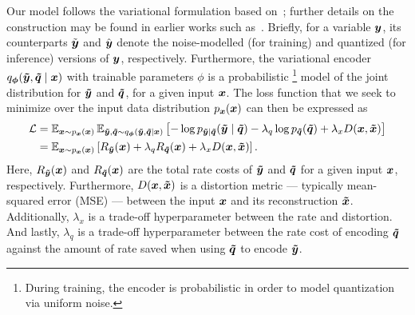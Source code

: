Our model follows the variational formulation based on~\cite{balle2018variational}; further details on the construction may be found in earlier works such as~\cite{kingma2013autoencoding,balle2017endtoend,theis2017lossy}.
Briefly, for a variable ${\boldsymbol{y}}$, its counterparts $\tilde{{\boldsymbol{y}}}$ and $\hat{{\boldsymbol{y}}}$ denote the noise-modelled (for training) and quantized (for inference) versions of ${\boldsymbol{y}}$, respectively.
Furthermore, the variational encoder $q_{{\boldsymbol{\phi}}}({\boldsymbol{\tilde{y}}}, {\boldsymbol{\tilde{q}}} \mid {\boldsymbol{x}})$ with trainable parameters $\phi$ is a probabilistic%
\footnote{During training, the encoder is probabilistic in order to model quantization via uniform noise.}
model of the joint distribution for ${\boldsymbol{\tilde{y}}}$ and ${\boldsymbol{\tilde{q}}}$, for a given input ${\boldsymbol{x}}$.
The loss function that we seek to minimize over the input data distribution $p_{{\boldsymbol{x}}}({\boldsymbol{x}})$ can then be expressed as
%
\begin{equation*}
  \begin{split}
    \mathcal{L}
    &=
    \operatorname{\mathbb{E}}_{{\boldsymbol{x}} \sim p_{{\boldsymbol{x}}}({\boldsymbol{x}})}
    \operatorname{\mathbb{E}}_{
      {\boldsymbol{\tilde{y}}}, {\boldsymbol{\tilde{q}}}
      \sim q_{{\boldsymbol{\phi}}}({\boldsymbol{\tilde{y}}}, {\boldsymbol{\tilde{q}}} \mid {\boldsymbol{x}})
    }
    \left[
      -\log p_{{\boldsymbol{\tilde{y}}} \mid {\boldsymbol{\tilde{q}}}}({\boldsymbol{\tilde{y}}} \mid {\boldsymbol{\tilde{q}}})
      - \lambda_q \log p_{{\boldsymbol{\tilde{q}}}}({\boldsymbol{\tilde{q}}})
      + \lambda_x D({\boldsymbol{x}}, {\boldsymbol{\tilde{x}}})
    \right]
    \\
    &=
    \operatorname{\mathbb{E}}_{{\boldsymbol{x}} \sim p_{{\boldsymbol{x}}}({\boldsymbol{x}})}
    \left[
      R_{{\boldsymbol{\tilde{y}}}}({\boldsymbol{x}})
      + \lambda_q R_{{\boldsymbol{\tilde{q}}}}({\boldsymbol{x}})
      + \lambda_x D({\boldsymbol{x}}, {\boldsymbol{\tilde{x}}})
    \right].
  \end{split}
\end{equation*}
%
Here, $R_{{\boldsymbol{\tilde{y}}}}({\boldsymbol{x}})$ and $R_{{\boldsymbol{\tilde{q}}}}({\boldsymbol{x}})$ are the total rate costs of ${\boldsymbol{\tilde{y}}}$ and ${\boldsymbol{\tilde{q}}}$ for a given input ${\boldsymbol{x}}$, respectively.
Furthermore, $D({\boldsymbol{x}}, {\boldsymbol{\tilde{x}}})$ is a distortion metric --- typically mean-squared error (MSE) --- between the input ${\boldsymbol{x}}$ and its reconstruction ${\boldsymbol{\tilde{x}}}$.
Additionally, $\lambda_x$ is a trade-off hyperparameter between the rate and distortion.
And lastly, $\lambda_q$ is a trade-off hyperparameter between the rate cost of encoding ${\boldsymbol{\tilde{q}}}$ against the amount of rate saved when using ${\boldsymbol{\tilde{q}}}$ to encode ${\boldsymbol{\tilde{y}}}$.

